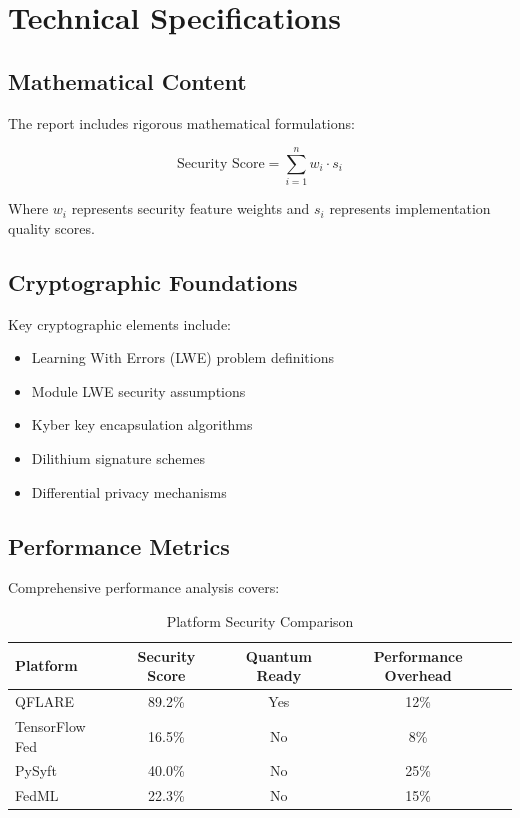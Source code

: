 \documentclass[11pt,a4paper]{article}
\begin{document}
\section{Technical Specifications}

\subsection{Mathematical Content}

The report includes rigorous mathematical formulations:

\begin{equation}
\text{Security Score} = \sum_{i=1}^{n} w_i \cdot s_i
\end{equation}

Where $w_i$ represents security feature weights and $s_i$ represents implementation quality scores.

\subsection{Cryptographic Foundations}

Key cryptographic elements include:

\begin{itemize}
\item Learning With Errors (LWE) problem definitions
\item Module LWE security assumptions  
\item Kyber key encapsulation algorithms
\item Dilithium signature schemes
\item Differential privacy mechanisms
\end{itemize}

\subsection{Performance Metrics}

Comprehensive performance analysis covers:

\begin{table}[h]
\centering
\caption{Platform Security Comparison}
\begin{tabular}{lcccc}
\toprule
Platform & Security Score & Quantum Ready & Performance Overhead \\
\midrule
QFLARE & 89.2\% & Yes & 12\% \\
TensorFlow Fed & 16.5\% & No & 8\% \\
PySyft & 40.0\% & No & 25\% \\
FedML & 22.3\% & No & 15\% \\
\bottomrule
\end{tabular}
\end{table}
\end{document}
